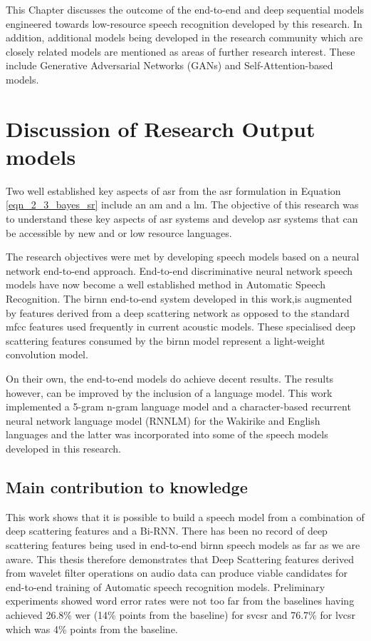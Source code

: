 {This Chapter discusses the outcome of the end-to-end and deep sequential models engineered towards low-resource speech recognition developed by this research. In addition, additional models being developed in the research community which are closely related models are mentioned as areas of further research interest.  These include Generative Adversarial Networks (GANs) and Self-Attention-based models. 

\section{Discussion of Research Output models}

Two well established key aspects of \acrshort{asr} from the \acrshort{asr} formulation in Equation \ref{eqn_2_3_bayes_sr} include an \acrfull{am} and a \acrfull{lm}. The objective of this research was to understand these key aspects of \acrshort{asr} systems and develop \acrshort{asr} systems that can be accessible by new and or low resource languages.

The research objectives were met by developing speech models based on a neural network end-to-end approach. End-to-end discriminative neural network speech models have now become a well established method in Automatic Speech Recognition.   The \acrfull{birnn} end-to-end system developed in this work,is augmented by features derived from a deep scattering network as opposed to the standard \acrfull{mfcc} features used frequently in current acoustic models.  These specialised deep scattering features consumed by the \acrshort{birnn} model represent a light-weight convolution model. 

On their own, the end-to-end models do achieve decent results. The results however,  can be improved by the inclusion of a language model.  This work implemented a 5-gram n-gram language model and a character-based recurrent neural network language model (RNNLM) for the Wakirike and English languages and the latter was incorporated into some of the speech models developed in this research.

\subsection{Main contribution to knowledge}
This work shows that it is possible to build a speech model from a combination of deep scattering features and a Bi-RNN. There has been no record of deep scattering features being used in end-to-end \acrshort{birnn} speech models as far as we are aware.  This thesis therefore demonstrates that Deep Scattering features derived from wavelet filter operations on audio data can produce viable candidates for end-to-end training of Automatic speech recognition models.  Preliminary experiments showed word error rates were not too far from the baselines having achieved 26.8\% \acrshort{wer} (14\% points from the baseline) for \acrshort{svcsr} and 76.7\% for \acrshort{lvcsr} which was 4\% points from the baseline.

}
